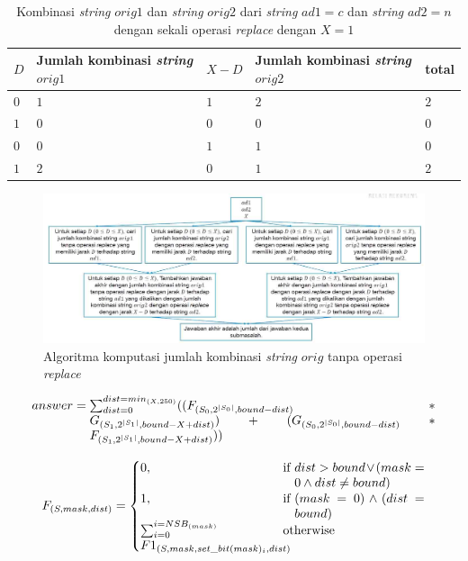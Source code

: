 \documentclass[a4paper]{IEEEtran}
\begin{document}
\begin{table}
	\centering
	\begin{tabular} {|p{1cm}|p{1.65cm}|p{1cm}|p{1.65cm}|p{0.5cm}|} \hline
		$ D $ & Jumlah kombinasi \textit{string} $ orig1 $ & $ X-D $ & Jumlah kombinasi \textit{string} $ orig2 $ & total \\ \hline
		$ 0 $ & $ 1 $ & $ 1 $ & $ 2 $ & $ 2 $ \\ \hline		
		$ 1 $ & $ 0 $ & $ 0 $ & $ 0 $ & $ 0 $ \\ \hline
		$ 0 $ & $ 0 $ & $ 1 $ & $ 1 $ & $ 0 $ \\ \hline
		$ 1 $ & $ 2 $ & $ 0 $ & $ 1 $ & $ 2 $ \\ \hline
	\end{tabular}\caption{Kombinasi \textit{string} $ orig1 $ dan \textit{string} $ orig2 $ dari \textit{string} $ ad1=c $ dan \textit{string} $ ad2= n$ dengan sekali operasi \textit{replace} dengan $ X=1$} 
	\label{tab:algo3_2}
\end{table}

\begin{figure}[h]
	\centering
	\includegraphics[width=\linewidth]{images/algo3.jpg}
	\caption{Algoritma komputasi jumlah kombinasi \textit{string} $ orig $ tanpa operasi \textit{replace}}
	\label{figure:algo3}
\end{figure}

\begin{equation}
answer = \parbox[t]{0.8\linewidth}{ $\sum_{dist=0}^{dist=min_{(X, 250)}}((F_{(S_{0}, 2^{|S_{0}|}, bound - dist)} * G_{(S_{1}, 2^{|S_{1}|}, bound - X + dist)}) + (G_{(S_{0}, 2^{|S_{0}|}, bound -dist)} * F_{(S_{1},2^{|S_{1}|},bound-X+dist)}))$}
\label{equation:main_answer}
\end{equation}


\begin{equation}
F_{(S,mask,dist)}= 
\begin{cases}
0,& \text{if }  \parbox[t]{0.3\linewidth} {$ dist > bound \vee (mask=0 \wedge dist \neq bound) $} \\
1,& \text{if }  \parbox[t]{0.3\linewidth} {$(mask=0) \wedge (dist=bound)$} \\
\parbox[t]{0.3\linewidth}{$ \sum_{i=0}^{i=NSB_{(mask)}} \\F1_{(S, mask,
		set\_bit(mask)_{i}, dist)} $}& \text{otherwise}
\end{cases}
\label{equation:rekurens_f}
\end{equation}
\end{document}
